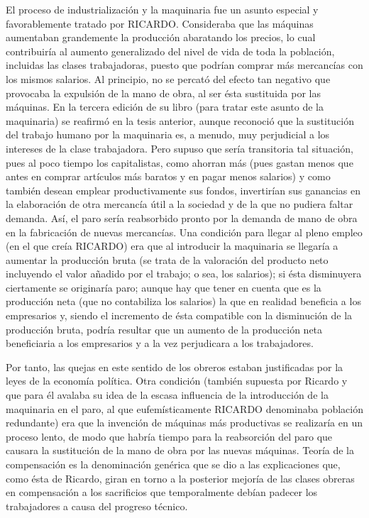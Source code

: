 \documentclass[10pt,a4paper]{article}
\begin{document}
El proceso de industrialización y la maquinaria fue un asunto especial y favorablemente tratado por RICARDO. Consideraba que las máquinas aumentaban grandemente la producción abaratando los precios, lo cual contribuiría al aumento generalizado del nivel de vida de toda la población, incluidas las clases trabajadoras, puesto que podrían comprar más mercancías con los mismos salarios. Al principio, no se percató del efecto tan negativo que provocaba la expulsión de la mano de obra, al ser ésta sustituida por las máquinas. En la tercera edición de su libro (para tratar este asunto de la maquinaria) se reafirmó en la tesis anterior, aunque reconoció que la sustitución del trabajo humano por la maquinaria es, a menudo, muy perjudicial a los intereses de la clase trabajadora. Pero supuso que sería transitoria tal situación, pues al poco tiempo los capitalistas, como ahorran más (pues gastan menos que antes en comprar artículos más baratos y en pagar menos salarios) y como también desean emplear productivamente sus fondos, invertirían sus ganancias en la elaboración de otra mercancía útil a la sociedad y de la que no pudiera faltar demanda. Así, el paro sería reabsorbido pronto por la demanda de mano de obra en la fabricación de nuevas mercancías. Una condición para llegar al pleno empleo (en el que creía RICARDO) era que al introducir la maquinaria se llegaría a aumentar la producción bruta (se trata de la valoración del producto neto incluyendo el valor añadido por el trabajo; o sea, los salarios); si ésta disminuyera ciertamente se originaría paro; aunque hay que tener en cuenta que es la producción neta (que no contabiliza los salarios) la que en realidad beneficia a los empresarios y, siendo el incremento de ésta compatible con la disminución de la producción bruta, podría resultar que un aumento de la producción neta beneficiaria a los empresarios y a la vez perjudicara a los trabajadores. 

Por tanto, las quejas en este sentido de los obreros estaban justificadas por la  leyes de la economía política. Otra condición (también supuesta por Ricardo y que para él avalaba su idea de la escasa influencia de la introducción de la maquinaria en el paro, al que eufemísticamente RICARDO denominaba población redundante) era que la invención de máquinas más productivas se realizaría en un proceso lento, de modo que habría tiempo para la reabsorción del paro que causara la sustitución de la mano de obra por las nuevas máquinas. Teoría de la compensación es la denominación genérica que se dio a las explicaciones que, como ésta de Ricardo, giran en torno a la posterior mejoría de las clases obreras en compensación a los sacrificios que temporalmente debían padecer los trabajadores a causa del progreso técnico.
\end{document}

